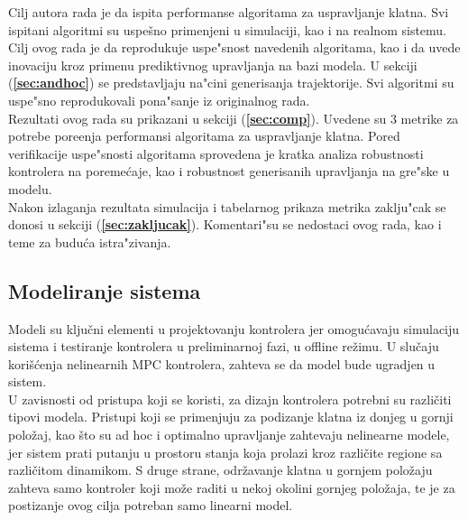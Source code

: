 \documentclass[a4paper,11pt]{article}
\theoremstyle{definition} \newtheorem{deff}{Definicija}[section]
\theoremstyle{definition} \newtheorem{prim}[deff]{Primer}
\theoremstyle{plain} \newtheorem{teor}[deff]{Teorema}
\begin{document}
	Cilj autora rada \cite{inicijalna} je da ispita performanse algoritama za uspravljanje klatna. Svi ispitani algoritmi su uspešno primenjeni u simulaciji, kao i na realnom sistemu. Cilj ovog rada je da reprodukuje uspe"snost navedenih algoritama, kao i da uvede inovaciju kroz primenu prediktivnog upravljanja na bazi modela. U sekciji (\textbf{\ref{sec:andhoc}}) se predstavljaju na"cini generisanja trajektorije. Svi algoritmi su uspe"sno reprodukovali pona"sanje iz originalnog rada.\\
	
	Rezultati ovog rada su prikazani u sekciji (\textbf{\ref{sec:comp}}). Uvedene su 3 metrike za potrebe pore\dj enja performansi algoritama za uspravljanje klatna. Pored verifikacije uspe"snosti algoritama sprovedena je kratka analiza robustnosti kontrolera na poreme\'caje, kao i robustnost generisanih upravljanja na gre"ske u modelu. \\
	
	Nakon izlaganja rezultata simulacija i tabelarnog prikaza metrika zaklju"cak se donosi u sekciji (\textbf{\ref{sec:zakljucak}}). Komentari"su se nedostaci ovog rada, kao i teme za budu\'ca istra"zivanja.
	
	
	
	
	
	
	
	
	
	
	
	
	\newpage
	
	\subsection{Modeliranje sistema}\label{sec:modeliranje}
	
	Modeli su ključni elementi u projektovanju kontrolera jer omogućavaju simulaciju sistema i testiranje kontrolera u preliminarnoj fazi, u offline režimu. U slučaju korišćenja nelinearnih MPC kontrolera, zahteva se da model bude ugradjen u sistem.  \\
	
	U zavisnosti od pristupa koji se koristi, za dizajn kontrolera potrebni su različiti tipovi modela. Pristupi koji se primenjuju za podizanje klatna iz donjeg u gornji položaj, kao što su ad hoc i optimalno upravljanje zahtevaju nelinearne modele, jer sistem prati putanju u prostoru stanja koja prolazi kroz različite regione sa različitom dinamikom. S druge strane, održavanje klatna u gornjem položaju zahteva samo kontroler koji može raditi u nekoj okolini gornjeg položaja, te je za postizanje ovog cilja potreban samo linearni model.  \\
	
\end{document}
